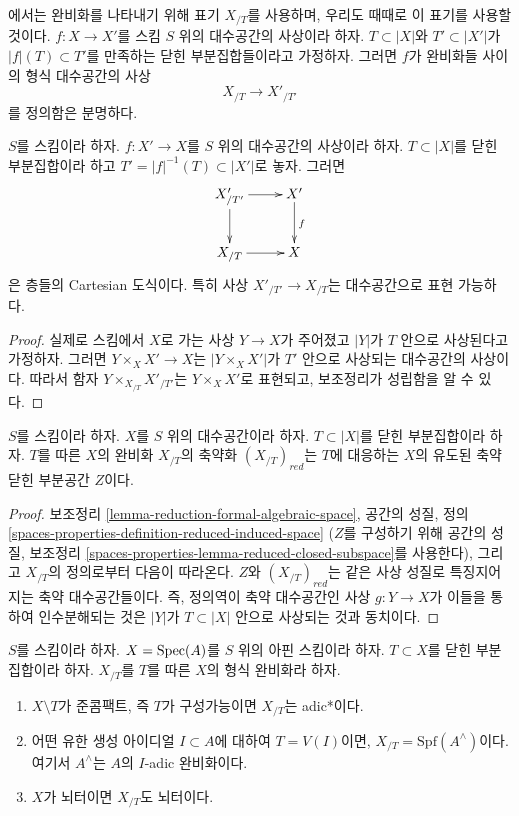 \noindent
\cite[Chapter I, Section 10.8]{EGA}에서는 완비화를 나타내기 위해
표기 $X_{/T}$를 사용하며, 우리도 때때로 이 표기를 사용할 것이다.
$f : X \to X'$를 스킴 $S$ 위의 대수공간의 사상이라 하자.
$T \subset |X|$와 $T' \subset |X'|$가
$|f|(T) \subset T'$를 만족하는 닫힌 부분집합들이라고 가정하자.
그러면 $f$가 완비화들 사이의 형식 대수공간의 사상
$$
X_{/T} \longrightarrow X'_{/T'}
$$
를 정의함은 분명하다.

\begin{lemma}
\label{lemma-map-completions-representable}
$S$를 스킴이라 하자. $f : X' \to X$를 $S$ 위의 대수공간의
사상이라 하자. $T \subset |X|$를 닫힌 부분집합이라 하고
$T' = |f|^{-1}(T) \subset |X'|$로 놓자. 그러면
$$
\xymatrix{
X'_{/T'} \ar[r] \ar[d] & X' \ar[d]^f \\
X_{/T} \ar[r] & X
}
$$
은 층들의 Cartesian 도식이다. 특히 사상
$X'_{/T'} \to X_{/T}$는 대수공간으로 표현 가능하다.
\end{lemma}

\begin{proof}
실제로 스킴에서 $X$로 가는 사상 $Y \to X$가 주어졌고 $|Y|$가 $T$ 안으로
사상된다고 가정하자.
그러면 $Y \times_X X' \to X$는 $|Y \times_X X'|$가 $T'$ 안으로
사상되는 대수공간의 사상이다. 따라서 함자
$Y \times_{X_{/T}} X'_{/T'}$는 $Y \times_X X'$로 표현되고,
보조정리가 성립함을 알 수 있다.
\end{proof}

\begin{lemma}
\label{lemma-reduction-completion}
$S$를 스킴이라 하자. $X$를 $S$ 위의 대수공간이라 하자.
$T \subset |X|$를 닫힌 부분집합이라 하자. $T$를 따른 $X$의
완비화 $X_{/T}$의 축약화 $(X_{/T})_{red}$는 $T$에 대응하는
$X$의 유도된 축약 닫힌 부분공간 $Z$이다.
\end{lemma}

\begin{proof}
보조정리 \ref{lemma-reduction-formal-algebraic-space}, 공간의 성질,
정의 \ref{spaces-properties-definition-reduced-induced-space}
($Z$를 구성하기 위해 공간의 성질, 보조정리
\ref{spaces-properties-lemma-reduced-closed-subspace}를 사용한다),
그리고 $X_{/T}$의 정의로부터 다음이 따라온다.
$Z$와 $(X_{/T})_{red}$는 같은 사상 성질로 특징지어지는 축약
대수공간들이다. 즉, 정의역이 축약 대수공간인 사상
$g : Y \to X$가 이들을 통하여 인수분해되는 것은 $|Y|$가
$T \subset |X|$ 안으로 사상되는 것과 동치이다.
\end{proof}

\begin{lemma}
\label{lemma-affine-formal-completion-types}
$S$를 스킴이라 하자. $X = \mathop{\mathrm{Spec}}(A)$를 $S$ 위의 아핀 스킴이라 하자.
$T \subset X$를 닫힌 부분집합이라 하자. $X_{/T}$를 $T$를 따른
$X$의 형식 완비화라 하자.
\begin{enumerate}
\item $X \setminus T$가 준콤팩트, 즉 $T$가 구성가능이면
$X_{/T}$는 adic*이다.
\item 어떤 유한 생성 아이디얼 $I \subset A$에 대하여
$T = V(I)$이면, $X_{/T} = \text{Spf}(A^\wedge)$이다. 여기서
$A^\wedge$는 $A$의 $I$-adic 완비화이다.
\item $X$가 뇌터이면 $X_{/T}$도 뇌터이다.
\end{enumerate}
\end{lemma}

